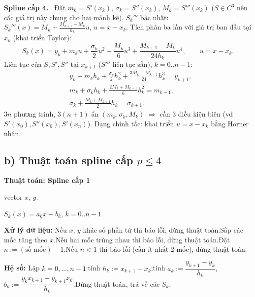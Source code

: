 \documentclass[11pt,a4paper]{article}
\newenvironment{thuattoan}[1]
  {\par\medskip\noindent\textbf{Thuật toán: #1}\begin{description}[style=standard,align=left,leftmargin=4.3em,labelwidth=3.9em,labelsep=0.4em,itemsep=1pt,topsep=3pt,font=\normalfont\bfseries]}
  {\end{description}}
\newcommand{\pp}[1]{\par\smallskip\noindent\textbf{#1}\ }
\newcommand{\thut}{\newline\hspace*{1.2em}}
\begin{document}
\pp{Spline cấp 4.} Đặt $m_k=S'(x_k)$, $\sigma_k=S''(x_k)$, $M_k=S'''(x_k)$ ($S\in C^3$ nên các giá trị này chung cho hai mảnh kề). $S_k'''$ bậc nhất: $S_k'''(x)=M_k+\frac{M_{k+1}-M_k}{h_k}u$, $u=x-x_k$. Tích phân ba lần với giá trị ban đầu tại $x_k$ (khai triển Taylor):
\[ S_k(x)=y_k+m_ku+\frac{\sigma_k}{2}u^2+\frac{M_k}{6}u^3+\frac{M_{k+1}-M_k}{24h_k}u^4,\qquad u=x-x_k. \]
Liên tục của $S,S',S''$ tại $x_{k+1}$ ($S'''$ liên tục sẵn), $k=0..n-1$:
\[ \boxed{\begin{aligned}
&y_k+m_kh_k+\frac{\sigma_k}{2}h_k^2+\frac{3M_k+M_{k+1}}{24}h_k^3=y_{k+1},\\
&m_k+\sigma_kh_k+\frac{2M_k+M_{k+1}}{6}h_k^2=m_{k+1},\\
&\sigma_k+\frac{M_k+M_{k+1}}{2}h_k=\sigma_{k+1}.
\end{aligned}} \]
$3n$ phương trình, $3(n+1)$ ẩn $(m_k,\sigma_k,M_k)$ $\Rightarrow$ cần 3 điều kiện biên (vd $S'(x_0),S''(x_0),S'(x_n)$). Dạng chính tắc: khai triển $u=x-x_k$ bằng Horner nhân.

\subsection{b) Thuật toán spline cấp $p\le4$}
\begin{thuattoan}{Spline cấp 1}
\item[Input:] vector $x$, $y$.
\item[Output:] $S_k(x)=a_kx+b_k$, $k=0..n-1$.
\item[Bước 0:] \textbf{Xử lý dữ liệu:} Nếu $x$, $y$ khác số phần tử thì báo lỗi, dừng thuật toán.\newline Sắp các mốc tăng theo $x$.\newline Nếu hai mốc trùng nhau thì báo lỗi, dừng thuật toán.\newline Đặt $n:=(\text{số mốc})-1$.\newline Nếu $n<1$ thì báo lỗi (cần ít nhất 2 mốc), dừng thuật toán.
\item[Bước 1:] \textbf{Hệ số:} Lặp $k=0,\dots,n-1$:\thut tính $h_k:=x_{k+1}-x_k$;\thut tính $a_k:=\dfrac{y_{k+1}-y_k}{h_k}$, $b_k:=\dfrac{y_kx_{k+1}-y_{k+1}x_k}{h_k}$.\newline Dừng thuật toán, trả về các $S_k$.
\end{thuattoan}
\end{document}

